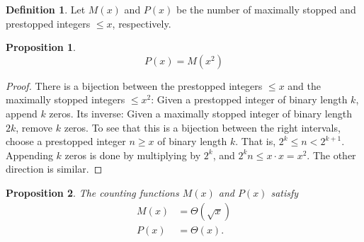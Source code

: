 \documentclass[12pt]{article}
\newtheorem{proposition}{Proposition}
\theoremstyle{definition}
\newtheorem{definition}{Definition}
\begin{document}
\begin{definition}
    Let $M(x)$ and $P(x)$ be the number of maximally stopped and prestopped
    integers $\leq x$, respectively.
\end{definition}

\begin{proposition}
    \begin{equation*}
        P(x) = M(x^2)
    \end{equation*}
\end{proposition}

\begin{proof}
    There is a bijection between the prestopped integers $\leq x$ and the
    maximally stopped integers $\leq x^2$: Given a prestopped integer of binary
    length $k$, append $k$ zeros. Its inverse: Given a maximally stopped
    integer of binary length $2k$, remove $k$ zeros. To see that this is a
    bijection between the right intervals, choose a prestopped integer $n \geq
    x$ of binary length $k$. That is, $2^k \leq n < 2^{k + 1}$. Appending $k$
    zeros is done by multiplying by $2^k$, and $2^k n \leq x \cdot x = x^2$.
    The other direction is similar.
\end{proof}

\begin{proposition}
    The counting functions $M(x)$ and $P(x)$ satisfy
    \begin{align*}
        M(x) &= \Theta(\sqrt{x}) \\
        P(x) &= \Theta(x).
    \end{align*}
\end{proposition}
\end{document}
